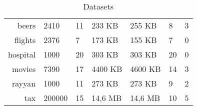 \begin{table}[!t]
\caption{\label{tab:datasets_table}Datasets}
\centering
\begin{tabular}{r|K|K|K|K|H|K}
\toprule
 &  &  &   &   &  & \\
\midrule
beers    &   2410 & 11 &  233 \textsc{KB} &  255 \textsc{KB} &  8 & 3 \\
flights  &   2376 &  7 &  173 \textsc{KB} &  155 \textsc{KB} &  7 & 0 \\
hospital &   1000 & 20 &  303 \textsc{KB} &  303 \textsc{KB} & 20 & 0 \\
movies   &   7390 & 17 & 4400 \textsc{KB} & 4600 \textsc{KB} & 14 & 3 \\
rayyan   &   1000 & 11 &  273 \textsc{KB} &  273 \textsc{KB} &  9 & 2 \\
tax      & 200000 & 15 & 14,6 \textsc{MB} & 14,6 \textsc{MB} & 10 & 5 \\
\bottomrule    
\end{tabular}
\end{table}
